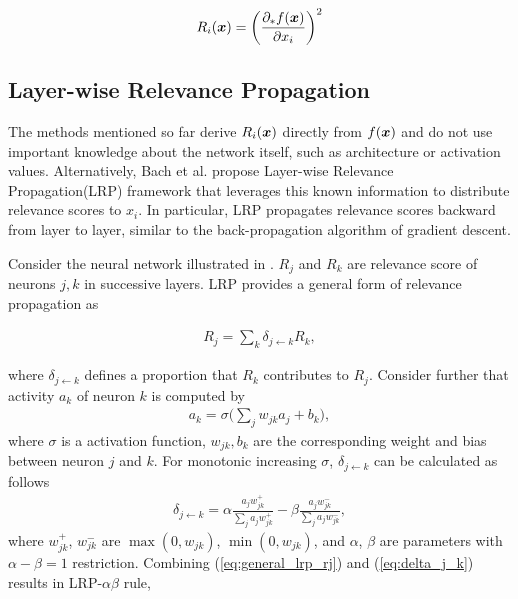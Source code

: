 \begin{align}
	R_i(\x) = \bigg( \frac{ \partial_* f(\patvector{x}) }{ \partial x_i }  \bigg)^2
\end{align}
%

\subsection{Layer-wise Relevance Propagation}
The methods mentioned so far derive $R_i(\boldsymbol{x})$ directly from $f(\patvector{x})$ and do not  use important knowledge about the network itself, such as architecture or activation values. Alternatively, Bach et	 al.\cite{BinderLayerWiseRelevancePropagation2016} propose Layer-wise Relevance Propagation(LRP) framework that leverages this known information to distribute relevance scores to $x_i$. In particular, LRP propagates relevance scores backward from layer to layer, similar to the back-propagation algorithm of gradient descent.




Consider the neural network illustrated in \addfigure{\ref{fig:lrp_graph}}. $R_j$ and $R_k$ are relevance score of  neurons $j,k$ in successive layers.  LRP provides a general form of relevance propagation as 

\begin{align} \label{eq:general_lrp_rj}
	R_j = \sum_{k} 	\delta_{j\leftarrow k} R_{k} ,
\end{align}

where $\delta_{j\leftarrow k}$ defines a proportion that  $R_{k}$ contributes to $R_j$. Consider further that activity $a_k$ of neuron $k$ is computed by 
\begin{align*}
	a_k = \sigma \bigg( \sum_{j} w_{jk} a_j + b_k \bigg),
\end{align*} 
where $\sigma$ is a activation function, $w_{jk}, b_k$ are the corresponding weight and bias between neuron $j$ and $k$. For monotonic increasing $\sigma$, $\delta_{j\leftarrow k}$ can be calculated as follows 
\begin{align} \label{eq:delta_j_k}
	\delta_{j\leftarrow k} = \alpha\frac{a_j w_{jk}^+}{\sum_{j} a_jw_{jk}^+} - \beta\frac{a_j w_{jk}^-}{\sum_{j} a_jw_{jk}^-},
\end{align}
where $w_{jk}^+$, $w_{jk}^-$ are $\max(0, w_{jk})$, $\min(0, w_{jk})$, and $\alpha$,  $\beta$ are parameters with $\alpha-\beta = 1$ restriction. Combining (\ref{eq:general_lrp_rj}) and (\ref{eq:delta_j_k}) results in LRP-$\alpha\beta$ rule, 

